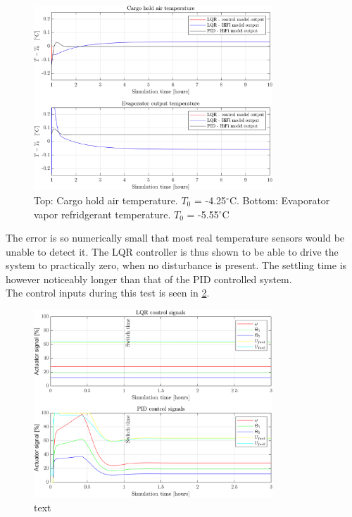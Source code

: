 \begin{figure}[H]
	\centering
	\includegraphics[width=0.8\textwidth]{Graphics/fig_LQRvsKresten_noDist_zoom.png}
	\caption{Top: Cargo hold air temperature. $T_0$ = -4.25$^{\circ}$C. Bottom: Evaporator vapor refridgerant temperature. $T_0$ = -5.55$^{\circ}$C}
	\label{fig:LQR_wellTuned_noDist_zoom}
\end{figure}

The error is so numerically small that most real temperature sensors would be unable to detect it. The LQR controller is thus shown to be able to drive the system to practically zero, when no disturbance is present. The settling time is however noticeably longer than that of the PID controlled system.  \\

The control inputs during this test is seen in \cref{fig:inputs_noDist}.

\begin{figure}[H]
	\centering
	\includegraphics[width=0.8\textwidth]{Graphics/fig_inputs_noDist.png}
	\caption{text}
	\label{fig:inputs_noDist}
\end{figure}

